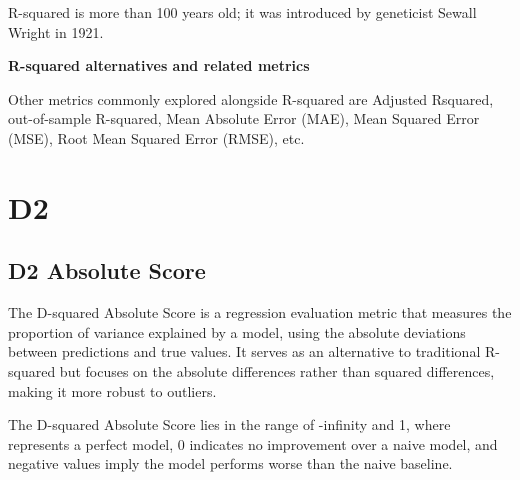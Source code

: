 {
R-squared is more than 100 years old; it was introduced by geneticist Sewall Wright in 1921.
}


\textbf{R-squared alternatives and related metrics}

Other metrics commonly explored alongside R-squared are Adjusted Rsquared, out-of-sample R-squared,
Mean Absolute Error (MAE), Mean Squared Error (MSE), Root Mean Squared Error (RMSE), etc.



\clearpage
\thispagestyle{regressionstyle}
\section{D2}
\subsection{D2 Absolute Score}

The D-squared Absolute Score is a regression evaluation metric that measures the proportion of variance explained by a model, using the absolute deviations between predictions and true values. 
It serves as an alternative to traditional R-squared but focuses on the absolute differences rather than squared differences, making it more robust to outliers.

\begin{center}
\end{center}

The D-squared Absolute Score lies in the range of -infinity and 1, where represents a perfect model, 0 indicates no improvement over a naive model,
and negative values imply the model performs worse than the naive baseline.

